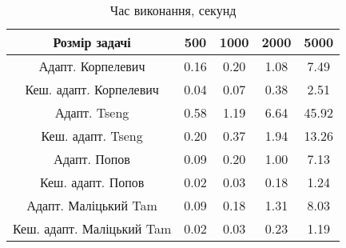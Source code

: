 \begin{table}[H]
	\centering
	\begin{tabular}{|c||c|c|c|c|}\hline
		Розмір задачі & 500 & 1000 & 2000 & 5000 \\ \hline \hline
		Адапт. Корпелевич & 0.16 & 0.20 & 1.08 & 7.49 \\ \hline
		Кеш. адапт. Корпелевич & 0.04 & 0.07 & 0.38 & 2.51 \\ \hline
		Адапт. Tseng & 0.58 & 1.19 & 6.64 & 45.92 \\ \hline
		Кеш. адапт. Tseng & 0.20 & 0.37 & 1.94 & 13.26 \\ \hline
		Адапт. Попов & 0.09 & 0.20 & 1.00 & 7.13 \\ \hline
		Кеш. адапт. Попов & 0.02 & 0.03 & 0.18 & 1.24 \\ \hline
		Адапт. Маліцький Tam & 0.09 & 0.18 & 1.31 & 8.03 \\ \hline
		Кеш. адапт. Маліцький Tam & 0.02 & 0.03 & 0.23 & 1.19 \\ \hline
	\end{tabular}
	\caption{Час виконання, секунд}
\end{table}
